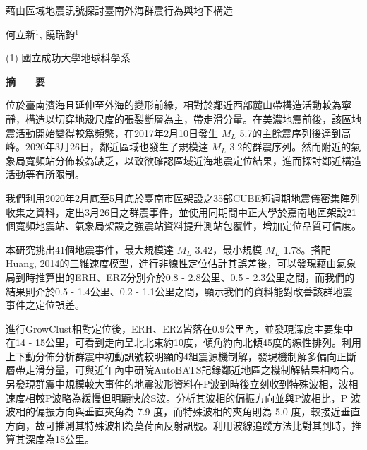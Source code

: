 \documentclass[a4paper]{article}
\begin{document}

\Large
 \begin{center}
藉由區域地震訊號探討臺南外海群震行為與地下構造\\ 

\hspace{10pt}

\large
何立新$^1$, 饒瑞鈞$^1$ \\

\hspace{10pt}

\small  
(1) 國立成功大學地球科學系\\

\hspace{10pt}


\large
\textbf{摘　　要}
\end{center}

\normalsize
位於臺南濱海且延伸至外海的變形前緣，相對於鄰近西部麓山帶構造活動較為寧靜，構造以切穿地殼尺度的張裂斷層為主，帶走滑分量。在美濃地震前後，該區地震活動開始變得較爲頻繁，在2017年2月10日發生 $M_{L}$ 5.7的主餘震序列後達到高峰。2020年3月26日，鄰近區域也發生了規模達 $M_{L}$ 3.2的群震序列。然而附近的氣象局寬頻站分佈較為缺乏，以致欲確認區域近海地震定位結果，進而探討鄰近構造活動等有所限制。

我們利用2020年2月底至5月底於臺南市區架設之35部CUBE短週期地震儀密集陣列收集之資料，定出3月26日之群震事件，並使用同期間中正大學於嘉南地區架設21個寬頻地震站、氣象局架設之強震站資料提升測站包覆性，增加定位品質可信度。

本研究挑出41個地震事件，最大規模達 $M_{L}$ 3.42，最小規模 $M_{L}$ 1.78。搭配Huang, 2014的三維速度模型，進行非線性定位估計其誤差後，可以發現藉由氣象局到時推算出的ERH、ERZ分別介於0.8 - 2.8公里、0.5 - 2.3公里之間，而我們的結果則介於0.5 - 1.4公里、0.2 - 1.1公里之間，顯示我們的資料能對改善該群地震事件之定位誤差。

進行GrowClust相對定位後，ERH、ERZ皆落在0.9公里內，並發現深度主要集中在14 - 15公里，可看到走向呈北北東約10度，傾角約向北傾45度的線性排列。利用上下動分佈分析群震中初動訊號較明顯的4組震源機制解，發現機制解多偏向正斷層帶走滑分量，可與近年內中研院AutoBATS記錄鄰近地區之機制解結果相吻合。另發現群震中規模較大事件的地震波形資料在P波到時後立刻收到特殊波相，波相速度相較P波略為緩慢但明顯快於S波。分析其波相的偏振方向並與P波相比，P 波波相的偏振方向與垂直夾角為 7.9 度，而特殊波相的夾角則為 5.0 度，較接近垂直方向，故可推測其特殊波相為莫荷面反射訊號。利用波線追蹤方法比對其到時，推算其深度為18公里。
\end{document}
